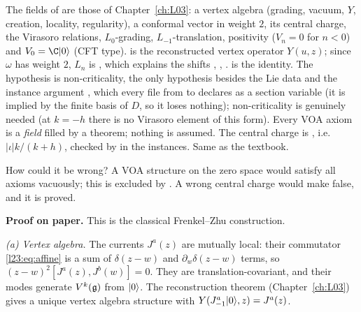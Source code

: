 \begin{dictionary}
The fields of  are those of Chapter~\ref{ch:L03}: a vertex algebra (grading, vacuum,
$Y$, creation, locality, regularity), a conformal vector in weight $2$, its central charge, the Virasoro relations,
$L_0$-grading, $L_{-1}$-translation, positivity ($V_n=0$ for $n<0$) and $V_0=\C\lxxiiivac$ (CFT type). 
is the reconstructed vertex operator $Y(u,z)$; since $\omega$ has weight $2$, $L_n$ is , which
explains the shifts , , .  is the identity. The hypothesis
 is non-criticality, the only hypothesis besides the Lie data and the instance argument
\lean{[FiniteDimensional ℂ 𝔤]}, which every file from  to  declares as a
section variable (it is implied by the finite basis of $D$, so it loses nothing); non-criticality is genuinely needed (at $k=-h$ there is no
Virasoro element of this form). Every VOA axiom is a \emph{field} filled by a theorem; nothing is assumed. The central
charge is , i.e.\ $|\iota|k/(k+h)$, checked by  in the instances. Same as the
textbook.

How could it be wrong? A VOA structure on the zero space would satisfy all axioms vacuously; this is excluded by
. A wrong central charge would make  false, and it is proved.
\end{dictionary}

\textbf{Proof on paper.} This is the classical Frenkel--Zhu construction. 

\emph{(a) Vertex algebra.} The currents $J^a(z)$ are mutually local: their commutator \eqref{l23:eq:affine} is a sum of
$\delta(z-w)$ and $\partial_w\delta(z-w)$ terms, so $(z-w)^2[J^a(z),J^b(w)]=0$. They are translation-covariant, and their modes
generate $V^k(\mathfrak g)$ from $|0\rangle$. The reconstruction theorem (Chapter~\ref{ch:L03}) gives a unique vertex algebra structure
with $Y(J^a_{-1}|0\rangle,z)=J^a(z)$.

